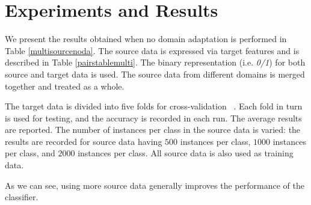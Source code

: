 \section{Experiments and Results}
\label{mdaexperiments}

We present the results obtained when no domain adaptation is performed in Table \ref{multisourcenoda}. The source data is expressed via target features and is described in Table \ref{pairstablemulti}. The binary representation (i.e. \textit{0/1}) for both source and target data is used. The source data from different domains is merged together and treated as a whole.

The target data is divided into five folds for cross-validation ~\citep{hastie}. Each fold in turn is used for testing, and the accuracy is recorded in each run. The average results are reported. The number of instances per class in the source data is varied: the results are recorded for source data having $500$ instances per class, $1000$ instances per class, and $2000$ instances per class. All source data is also used as training data. 

As we can see, using more source data generally improves the performance of the classifier.

